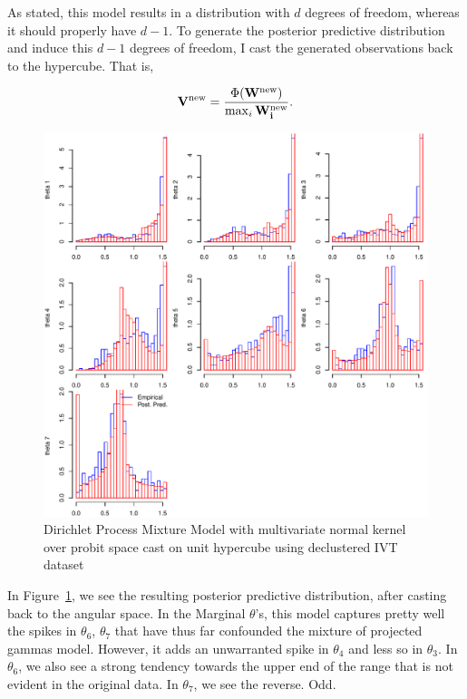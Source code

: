 As stated, this model results in a distribution with $d$ degrees of freedom, whereas it should
  properly have $d-1$.  To generate the posterior predictive distribution and induce this $d-1$
  degrees of freedom, I cast the generated observations back to the hypercube.  That is,

  \begin{equation*}
    {\bf V}^{\text{new}} = \frac{\Phi({\bf W^{\text{new}}})}{\max_i{\bf W_i^{\text{new}}}}.
  \end{equation*}

\begin{figure}[h!]
  \label{fig:dpnormal}
  \centering
  \caption{Dirichlet Process Mixture Model with multivariate normal kernel over probit space cast
            on unit hypercube using declustered IVT dataset}
  \includegraphics[width=6in]{./images/dpmp_emp_v_pred_decluster}
\end{figure}

In Figure~\ref{fig:dpnormal}, we see the resulting posterior predictive distribution, after
  casting back to the angular space.  In the Marginal $\theta$'s, this model captures pretty well
  the spikes in $\theta_6$, $\theta_7$ that have thus far confounded the mixture of projected
  gammas model.  However, it adds an unwarranted spike in $\theta_4$ and less so in $\theta_3$.
  In $\theta_6$, we also see a strong tendency towards the upper end of the range that is not
  evident in the original data.  In $\theta_7$, we see the reverse.  Odd.

